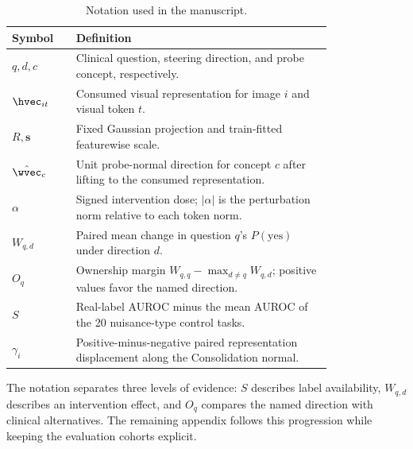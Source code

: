 \begin{table}[H]
\centering
\caption{Notation used in the manuscript.}
\label{tab:notation}
\begin{tabular}{l>{\raggedright\arraybackslash}p{0.8\linewidth}}
\toprule
Symbol & Definition \\
\midrule
$q,d,c$ & Clinical question, steering direction, and probe concept, respectively. \\
$\hvec_{it}$ & Consumed visual representation for image $i$ and visual token $t$. \\
$R,\boldsymbol{s}$ & Fixed Gaussian projection and train-fitted featurewise scale. \\
$\hat\wvec_c$ & Unit probe-normal direction for concept $c$ after lifting to the consumed representation. \\
$\alpha$ & Signed intervention dose; $|\alpha|$ is the perturbation norm relative to each token norm. \\
$W_{q,d}$ & Paired mean change in question $q$'s $P(\mathrm{yes})$ under direction $d$. \\
$O_q$ & Ownership margin $W_{q,q}-\max_{d\neq q}W_{q,d}$; positive values favor the named direction. \\
$S$ & Real-label AUROC minus the mean AUROC of the 20 nuisance-type control tasks. \\
$\gamma_i$ & Positive-minus-negative paired representation displacement along the Consolidation normal. \\
\bottomrule
\end{tabular}
\end{table}

The notation separates three levels of evidence: $S$ describes label
availability, $W_{q,d}$ describes an intervention effect, and $O_q$ compares
the named direction with clinical alternatives. The remaining appendix
follows this progression while keeping the evaluation cohorts explicit.

\FloatBarrier

